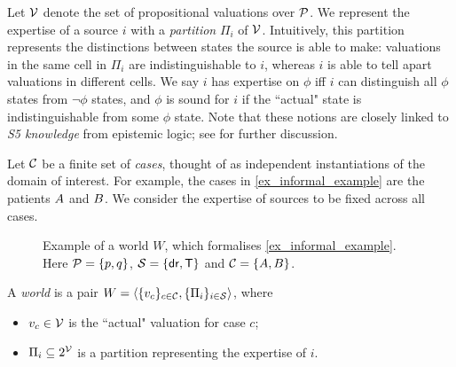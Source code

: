 Let $\mathcal{V}$ denote the set of propositional valuations
over $\mathcal{P}$. We represent the expertise of a source $i$ with a
\emph{partition} $\Pi_i$ of $\mathcal{V}$. Intuitively, this partition represents
the distinctions between states the source is able to make: valuations in the
same cell in $\Pi_i$ are indistinguishable to $i$, whereas $i$ is able to tell
apart valuations in different cells. We say $i$ has expertise on $\phi$ iff $i$
can distinguish all $\phi$ states from $\neg\phi$ states, and $\phi$ is sound
for $i$ if the ``actual" state is indistinguishable from some $\phi$ state.
Note that these notions are closely linked to \emph{S5 knowledge} from
epistemic logic; see
\cite{singleton_booth_22_preprint,singleton2021logic} for further discussion.

Let $\mathcal{C}$ be a finite set of \emph{cases}, thought of as independent
instantiations of the domain of interest. For example, the cases in
\cref{ex_informal_example} are the patients $A{}$ and $B{}$. We
consider the expertise of sources to be fixed across all cases.

\begin{figure}
    \centering
    
    \caption{
        Example of a world $W$, which formalises \cref{ex_informal_example}.
        Here $\mathcal{P} = \{p, q\}$, $\mathcal{S} = \{\mathsf{dr}{}, \mathsf{T}{}\}$ and $\mathcal{C} =
        \{A{}, B{}\}$.
    }
    \label{fig_example_world}
\end{figure}

A \emph{world} is a pair $W = \langle {\{v_c\}_{c \in \mathcal{C}},
\{\Pi_i\}_{i \in \mathcal{S}}} \rangle$, where
\begin{itemize}
    \item $v_c \in \mathcal{V}$ is the ``actual" valuation for case $c$;
    \item $\Pi_i \subseteq 2^{\mathcal{V}}$ is a partition representing the
          expertise of $i$.
\end{itemize}

